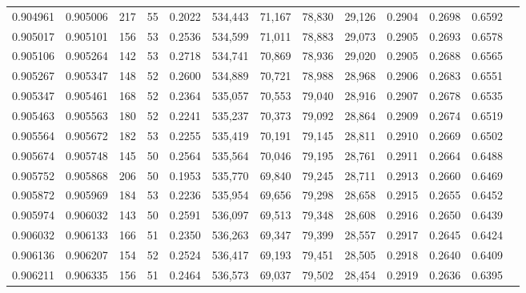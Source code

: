 \begin{tabular}{rrrrrrrrrrrrr}
0.904961 & 0.905006 &   217 &  55 &                                     0.2022 & 534,443 &  71,167 &  78,830 &  29,126 & 0.2904 & 0.2698 & 0.6592 \\
0.905017 & 0.905101 &   156 &  53 &                                     0.2536 & 534,599 &  71,011 &  78,883 &  29,073 & 0.2905 & 0.2693 & 0.6578 \\
0.905106 & 0.905264 &   142 &  53 &                                     0.2718 & 534,741 &  70,869 &  78,936 &  29,020 & 0.2905 & 0.2688 & 0.6565 \\
0.905267 & 0.905347 &   148 &  52 &                                     0.2600 & 534,889 &  70,721 &  78,988 &  28,968 & 0.2906 & 0.2683 & 0.6551 \\
0.905347 & 0.905461 &   168 &  52 &                                     0.2364 & 535,057 &  70,553 &  79,040 &  28,916 & 0.2907 & 0.2678 & 0.6535 \\
0.905463 & 0.905563 &   180 &  52 &                                     0.2241 & 535,237 &  70,373 &  79,092 &  28,864 & 0.2909 & 0.2674 & 0.6519 \\
0.905564 & 0.905672 &   182 &  53 &                                     0.2255 & 535,419 &  70,191 &  79,145 &  28,811 & 0.2910 & 0.2669 & 0.6502 \\
0.905674 & 0.905748 &   145 &  50 &                                     0.2564 & 535,564 &  70,046 &  79,195 &  28,761 & 0.2911 & 0.2664 & 0.6488 \\
0.905752 & 0.905868 &   206 &  50 &                                     0.1953 & 535,770 &  69,840 &  79,245 &  28,711 & 0.2913 & 0.2660 & 0.6469 \\
0.905872 & 0.905969 &   184 &  53 &                                     0.2236 & 535,954 &  69,656 &  79,298 &  28,658 & 0.2915 & 0.2655 & 0.6452 \\
0.905974 & 0.906032 &   143 &  50 &                                     0.2591 & 536,097 &  69,513 &  79,348 &  28,608 & 0.2916 & 0.2650 & 0.6439 \\
0.906032 & 0.906133 &   166 &  51 &                                     0.2350 & 536,263 &  69,347 &  79,399 &  28,557 & 0.2917 & 0.2645 & 0.6424 \\
0.906136 & 0.906207 &   154 &  52 &                                     0.2524 & 536,417 &  69,193 &  79,451 &  28,505 & 0.2918 & 0.2640 & 0.6409 \\
0.906211 & 0.906335 &   156 &  51 &                                     0.2464 & 536,573 &  69,037 &  79,502 &  28,454 & 0.2919 & 0.2636 & 0.6395 \\

\end{tabular}
